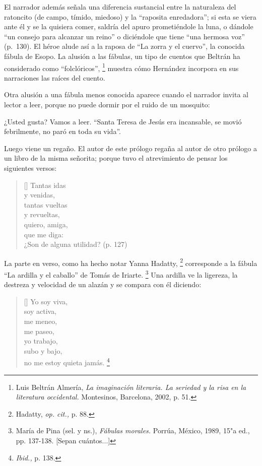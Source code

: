 \documentclass[14pt,twoside,final]{extbook} %
\let\oldfootnote\footnote
\renewcommand\footnote[1]{%
\oldfootnote{\hspace{1mm}#1}}
\begin{document}
El narrador además señala una diferencia sustancial entre la naturaleza del ratoncito (de campo, tímido, miedoso) y la ``raposita enredadora''; si esta se viera ante él y se la quisiera comer, saldría del apuro prometiéndole la luna, o dándole ``un consejo para alcanzar un reino'' o diciéndole que tiene ``una hermosa voz'' (p.~130). El héroe alude así a la raposa de ``La zorra y el cuervo'', la conocida fábula de Esopo. La alusión a las fábulas, un tipo de cuentos que Beltrán ha considerado como ``folclóricos'',\footnote{Luis Beltrán Almería, \emph{La imaginación literaria. La seriedad y la risa en la literatura occidental.} Montesinos, Barcelona, 2002, p. 51.} muestra cómo Hernández incorpora en sus narraciones las raíces del cuento.\protect\enlargethispage*{\baselineskip}

Otra alusión a una fábula menos conocida aparece cuando el narrador invita al lector a leer, porque no puede dormir por el ruido de un mosquito:
\begin{quoting}
¿Usted gusta? Vamos a leer. ``Santa Teresa de Jesús era incansable, se movió febrilmente, no paró en toda su vida''.

Luego viene un regaño. El autor de este prólogo regaña al autor de otro prólogo a un libro de la misma señorita; porque tuvo el atrevimiento de pensar los siguientes versos:
\settowidth{\versewidth}{¿Son de alguna utilidad? (p. 127)}
\begin{verse}[\versewidth]
Tantas idas \\
y venidas, \\
tantas vueltas \\
y revueltas, \\
quiero, amiga, \\
que me diga: \\
¿Son de alguna utilidad? (p. 127)
\end{verse}
\end{quoting}
La parte en verso, como ha hecho notar Yanna Hadatty,\footnote{Hadatty, \emph{op. cit.,} p. 88.} corresponde a la fábula ``La ardilla y el caballo'' de Tomás de Iriarte.\footnote{María de Pina (sel. y ns.), \emph{Fábulas morales.} Porrúa, México, 1989, 15"a ed., pp. 137-138. [Sepan cuántos...]} Una ardilla ve la ligereza, la destreza y velocidad de un alazán y se compara con él
diciendo:
\settowidth{\versewidth}{no me estoy quieta jamás.}
\begin{verse}[\versewidth]
Yo soy viva, \\
soy activa, \\
me meneo, \\
me paseo, \\
yo trabajo, \\
subo y bajo, \\
no me estoy quieta jamás.\footnote{\emph{Ibid.,} p. 138.}
\end{verse}
\end{document}
